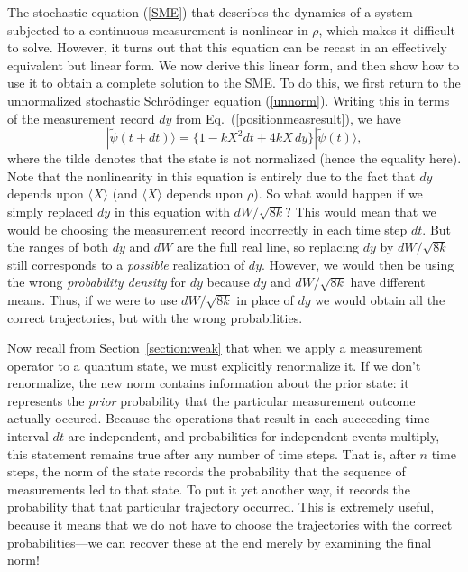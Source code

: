 \documentclass[aps,twocolumn,superscriptaddress,footinbib,floatfix,showpacs]{revtex4}
\begin{document}
The stochastic equation (\ref{SME}) that describes the
dynamics of a system subjected to a continuous measurement is
nonlinear in $\rho$, which makes it difficult to solve. However, it turns
out that this equation can be recast in an effectively
equivalent but linear form. We now derive this linear form, and then show 
how to use it to obtain a complete solution to the SME. To do this, we first 
return to the unnormalized stochastic Schr\"{o}dinger 
equation (\ref{unnorm}). Writing this in terms of the measurement 
record $dy$ from Eq.~(\ref{positionmeasresult}), we have 
\begin{equation}
  |\tilde{\psi}(t+dt)\rangle =  \{ 1 -  k X^2 dt + 4kX\, dy  \}  |\tilde{\psi}(t)\rangle ,
  \label{unnorm2}
\end{equation}
where the tilde denotes that the state is not normalized (hence the 
equality here). 
Note that the nonlinearity 
in this equation is entirely due to the fact that 
$dy$ depends upon $\langle X \rangle$ 
(and $\langle X \rangle$ depends upon $\rho$). So what would 
happen if we simply replaced $dy$ in this equation with $dW/\sqrt{8k}$? 
This would mean that we would be choosing the measurement record
incorrectly in each time step $dt$.  
But the ranges of both $dy$ and $dW$ are the full real line, 
so replacing $dy$ by $dW/\sqrt{8k}$ still corresponds to 
a \textit{possible} realization of $dy$.  However, 
we would then be using the wrong \textit{probability density}
for $dy$ because $dy$ and $dW/\sqrt{8k}$ have different means.
Thus, if we were to use $dW/\sqrt{8k}$ in place of $dy$
we would obtain all the correct trajectories, but with the wrong
probabilities.

Now recall from Section~\ref{section:weak} that when we apply a
measurement operator to a quantum state, we must explicitly
renormalize it.  If we don't renormalize, the new norm contains
information about the prior state: it represents the 
\textit{prior} probability that the particular measurement outcome
actually occured.
Because the operations that result in each
succeeding time interval $dt$ are independent, and probabilities
for independent events multiply, this statement remains true after any number of
time steps.  That is, after $n$ time steps, the norm of the state
records the probability that the sequence of measurements led to that
state.  To put it yet another way, it records the probability that
that particular trajectory occurred.  This is extremely useful,
because it means that we do not have to choose the trajectories with
the correct probabilities---we can recover these at the end merely
by examining the final norm! 
\end{document}
